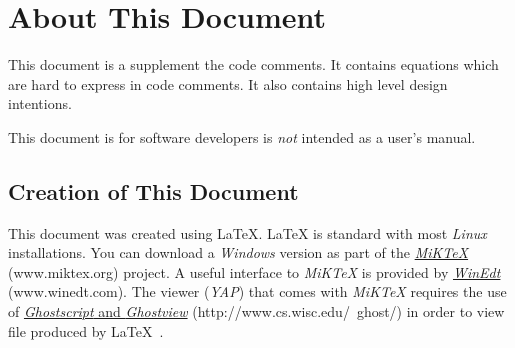     \chapter*{About This Document}

This document is a supplement the code comments.  It contains equations which are hard to express in code comments.  It also contains high level design intentions.

This document is for software developers is \emph{not} intended as a user's manual.

    \section*{Creation of This Document}

This document was created using \LaTeX{}\@.  \LaTeX{} is standard with most \emph{Linux} installations. You can download a \emph{Windows} version as part of the \href{http://www.miktex.org/}{\emph{MiKTeX}} (www.miktex.org) project. A useful interface to \emph{MiKTeX} is provided by \href{http://www.winedt.com/}{\emph{WinEdt}}  (www.winedt.com). The  viewer (\emph{YAP}) that comes with \emph{MiKTeX} requires the use of \href{http://www.cs.wisc.edu/~ghost/}{\emph{Ghostscript} and \emph{Ghostview}} (http://www.cs.wisc.edu/~ghost/)  in order to view  file produced by \LaTeX{}~\cite{ref:kopka1999a}.

